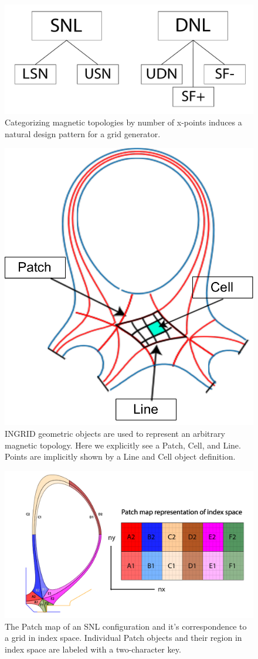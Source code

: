 \newpage

\begin{figure}[H]
    \centering
    \includegraphics[width=\linewidth]{figures/config_group.pdf}
    \caption{Categorizing magnetic topologies by number of x-points induces a natural design pattern for a grid generator.}
    \label{fig:config_group}
\end{figure}

\begin{figure}[H]
    \centering
    \includegraphics[width=0.35\linewidth]{figures/geometry_render.pdf}  %
    \caption{\label{fig:geo_collection} INGRID geometric objects are used to represent an arbitrary magnetic topology. Here we explicitly see a Patch, Cell, and Line. Points are implicitly shown by a Line and Cell object definition.}
\end{figure}

\begin{figure}[H]
    \centering
    \includegraphics[width=\linewidth]{figures/patch_index_space.pdf}
    \caption{The Patch map of an SNL configuration and it's correspondence to a grid in index space. Individual Patch objects and their region in index space are labeled with a two-character key.}
    \label{fig:snl_patch_index_space}
\end{figure}

